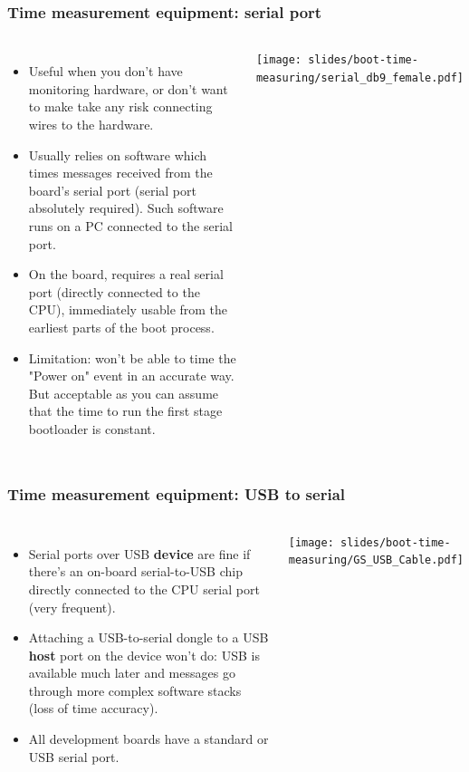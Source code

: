 \begin{frame}
\frametitle{Time measurement equipment: serial port}
\begin{columns}
\begin{itemize}
\item Useful when you don't have monitoring hardware, or don't want to make
      take any risk connecting wires to the hardware.
\item Usually relies on software which times messages received from the board's
      serial port (serial port absolutely required). Such software
      runs on a PC connected to the serial port.
\item On the board, requires a real serial port (directly connected to the CPU),
      immediately usable from the earliest parts of the boot process.
\item Limitation: won't be able to time the "Power on" event in
      an accurate way. But acceptable as you can assume that
      the time to run the first stage bootloader is constant.
\end{itemize}
\texttt{[image: slides/boot-time-measuring/serial\_db9\_female.pdf]}
\end{columns}
\end{frame}

\begin{frame}
\frametitle{Time measurement equipment: USB to serial}
\begin{columns}
	\begin{itemize}
	\item Serial ports over USB {\bf device} are fine if there's an on-board
	      serial-to-USB chip directly connected to the CPU serial port (very frequent).
	\item Attaching a USB-to-serial dongle to a USB {\bf host} port on
	      the device won't do: USB is available much later and messages
	      go through more complex software stacks (loss of time accuracy).
	\item All development boards have a standard or USB serial port.
	\end{itemize}
	\texttt{[image: slides/boot-time-measuring/GS\_USB\_Cable.pdf]}
\end{columns}
\end{frame}

